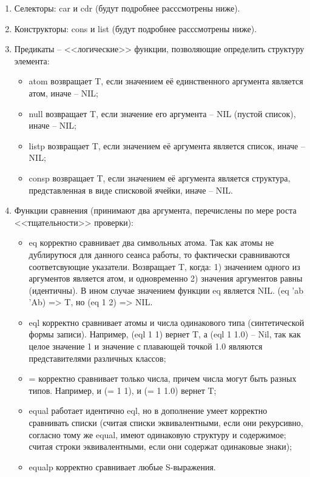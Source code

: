 \documentclass[12pt]{report}
\begin{document}
\begin{enumerate}
	\item Селекторы: car и cdr (будут подробнее расссмотрены ниже).
	\item Конструкторы: cons и list (будут подробнее расссмотрены ниже).
	\item Предикаты -- <<логические>> функции, позволяющие определить структуру элемента:
	\begin{itemize}
		\item atom возвращает T, если значением её единственного аргумента является атом, иначе -- NIL;
		\item null возвращает T, если значение его аргумента -- NIL (пустой список), иначе -- NIL;
		\item listp возвращает T, если значением её аргумента является список, иначе -- NIL;
		\item consp возвращает T, если значением её аргумента является структура, представленная в виде списковой ячейки, иначе -- NIL. 
	\end{itemize}
	\item Функции сравнения (принимают два аргумента, перечислены по мере роста <<тщательности>> проверки):
	\begin{itemize}
		\item eq корректно сравнивает два символьных атома. Так как атомы не дублирутюся для данного сеанса работы, то фактически сравниваются соответсвующие указатели. 
		Возвращает T, когда: 1) значением одного из аргументов является атом, и одновременно 2) значения аргументов равны (идентичны). В ином случае значением функции eq является NIL. (eq  'ab 'Ab) => T, но (eq 1 2) => NIL.
		\item eql корректно сравнивает атомы и числа одинакового типа (синтетической формы записи). Например, (eql 1 1) вернет T, а (eql 1 1.0) -- Nil, так как целое значение 1 и значение с плавающей точкой 1.0 являются представителями различных классов;
		\item = корректно сравнивает только числа, причем числа могут быть разных типов. Например, и (= 1 1), и (= 1 1.0) вернет T;
		\item equal работает идентично eql, но в дополнение умеет корректно сравнивать списки (считая списки эквивалентными, если они рекурсивно, согласно тому же equal, имеют одинаковую структуру и содержимое; считая строки эквивалентными, если они содержат одинаковые знаки);
		\item equalp корректно сравнивает любые S-выражения. 
	\end{itemize}
\end{enumerate}
	
\end{document}
